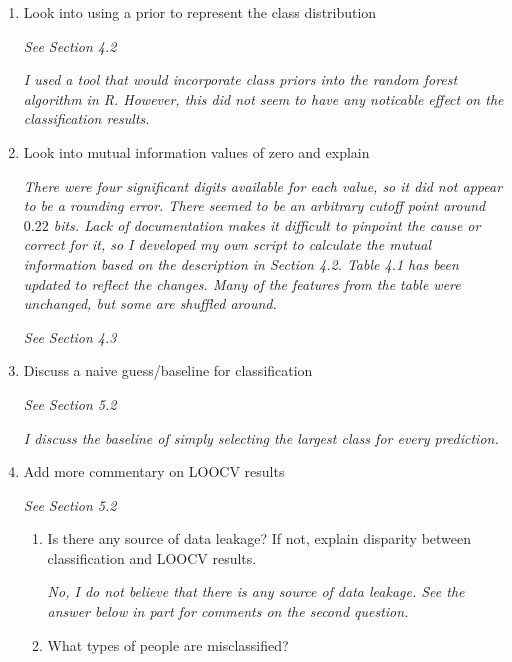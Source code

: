 \documentclass[12pt]{report}
\begin{document}
\begin{enumerate}
    \item Look into using a prior to represent the class distribution
    \par \textit{See Section 4.2}
    \par \textit{I used a tool that would incorporate class priors into the random forest algorithm in R.  However, this did not seem to have any noticable effect on the classification results.}
	\item Look into mutual information values of zero and explain 

    	\par \textit{There were four significant digits available for each value, so it did not appear to be a rounding error.
    		  There seemed to be an arbitrary cutoff point around $0.22$ bits.
    		  Lack of documentation makes it difficult to pinpoint the cause or correct for it, so I developed my own script to calculate the mutual information based on the description in Section 4.2.
    		  Table 4.1 has been updated to reflect the changes.
    		  Many of the features from the table were unchanged, but some are shuffled around.}
	\par \textit{See Section 4.3}


    \item Discuss a naive guess/baseline for classification
    \par \textit{See Section 5.2}    
    \par \textit{I discuss the baseline of simply selecting the largest class for every prediction.}    
	\item Add more commentary on LOOCV results
	\par \textit{See Section 5.2}
    \begin{enumerate}
   	    \item Is there any source of data leakage? If not, explain disparity between classification and LOOCV results.
   	    \par \textit{No, I do not believe that there is any source of data leakage.  See the answer below in part  for comments on the second question.}
		\item What types of people are misclassified?




\end{enumerate}
\end{enumerate}
\end{document}
